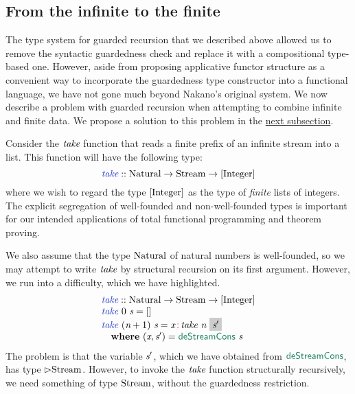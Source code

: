 \subsection{From the infinite to the finite}
\label{sec:infinite-to-finite}

The type system for guarded recursion that we described above allowed
us to remove the syntactic guardedness check and replace it with a
compositional type-based one. However, aside from proposing
applicative functor structure as a convenient way to incorporate the
guardedness type constructor into a functional language, we have not
gone much beyond Nakano's original system. We now describe a problem
with guarded recursion when attempting to combine infinite and finite
data. We propose a solution to this problem in the
\hyperref[sec:clock-vars]{next subsection}.

Consider the $\textit{take}$ function that reads a finite prefix of an
infinite stream into a list. This function will have the following type:
\begin{displaymath}
  \defn{take} :: \tyname{Natural} \to \tyname{Stream} \to [\tyname{Integer}]
\end{displaymath}
where we wish to regard the type $[\textrm{Integer}]$ as the type of
\emph{finite} lists of integers. The explicit segregation of
well-founded and non-well-founded types is important for our intended
applications of total functional programming and theorem proving.

We also assume that the type $\textrm{Natural}$ of natural numbers is
well-founded, so we may attempt to write $\textit{take}$ by structural
recursion on its first argument. However, we run into a difficulty,
which we have \colorbox{greybg}{highlighted}.
\begin{displaymath}
  \begin{array}{l}
    \defn{take} :: \tyname{Natural} \to \tyname{Stream} \to [\tyname{Integer}] \\
    \defn{take}\ 0\ \ident{s} = [] \\
    \defn{take}\ (\ident{n}+1)\ \ident{s} = \ident{x} \mathop{\cons{:}} \ident{take}\ \ident{n}\ \colorbox{greybg}{$\ident{s$'$}$} \\
    \quad \kw{where}\ (\ident{x}, \ident{s$'$}) = \elim{deStreamCons}\ \ident{s}
  \end{array}
\end{displaymath}
The problem is that the variable $\textit{s$'$}$, which we have obtained
from $\elim{deStreamCons}$, has type $\rhd\textrm{Stream}$. However,
to invoke the $\textit{take}$ function structurally recursively, we
need something of type $\textrm{Stream}$, without the guardedness
restriction.

